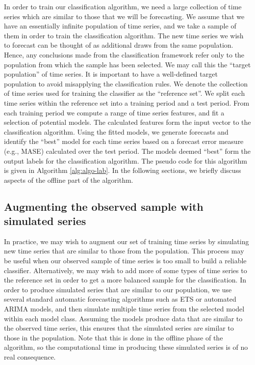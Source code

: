 \documentclass[11pt,a4paper,]{article}
\theoremstyle{definition}
\theoremstyle{definition}
\theoremstyle{definition}
\theoremstyle{remark}
\begin{document}
In order to train our classification algorithm, we need a large
collection of time series which are similar to those that we will be
forecasting. We assume that we have an essentially infinite population
of time series, and we take a sample of them in order to train the
classification algorithm. The new time series we wish to forecast can be
thought of as additional draws from the same population. Hence, any
conclusions made from the classification framework refer only to the
population from which the sample has been selected. We may call this the
``target population'' of time series. It is important to have a
well-defined target population to avoid misapplying the classification
rules. We denote the collection of time series used for training the
classifier as the ``reference set''. We split each time series within
the reference set into a training period and a test period. From each
training period we compute a range of time series features, and fit a
selection of potential models. The calculated features form the input
vector to the classification algorithm. Using the fitted models, we
generate forecasts and identify the ``best'' model for each time series
based on a forecast error measure (e.g., MASE) calculated over the test
period. The models deemed ``best'' form the output labels for the
classification algorithm. The pseudo code for this algorithm is given in
Algorithm \autoref{alg:algo-lab}. In the following sections, we briefly
discuss aspects of the offline part of the algorithm.

\subsection{Augmenting the observed sample with simulated
series}\label{augmenting-the-observed-sample-with-simulated-series}

In practice, we may wish to augment our set of training time series by
simulating new time series that are similar to those from the
population. This process may be useful when our observed sample of time
series is too small to build a reliable classifier. Alternatively, we
may wish to add more of some types of time series to the reference set
in order to get a more balanced sample for the classification. In order
to produce simulated series that are similar to our population, we use
several standard automatic forecasting algorithms such as ETS or
automated ARIMA models, and then simulate multiple time series from the
selected model within each model class. Assuming the models produce data
that are similar to the observed time series, this ensures that the
simulated series are similar to those in the population. Note that this
is done in the offline phase of the algorithm, so the computational time
in producing these simulated series is of no real consequence.
\end{document}
